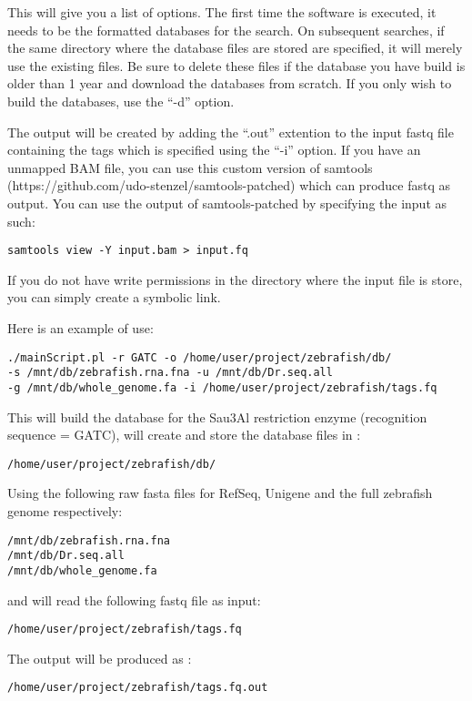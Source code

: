 \documentclass[a4paper,12pt]{article}
\begin{document}
This will give you a list of options. The first time the software is executed, it needs to be the formatted databases for the search. On subsequent searches, if the same directory where the database files are stored are specified, it will merely use the existing files. Be sure to delete these files if the database you have build is older than 1 year and download the databases from scratch. If you only wish to build the databases, use the ``-d'' option. 

The output will be created by adding the ``.out'' extention to the input fastq file containing the tags which is specified using the ``-i'' option. If you have an unmapped BAM file, you can use this custom version of samtools (https://github.com/udo-stenzel/samtools-patched) which can produce fastq as output. You can use the output of samtools-patched by specifying the input as such:
\small{
\begin{verbatim}
samtools view -Y input.bam > input.fq
\end{verbatim}
}

If you do not have write permissions in the directory where the input file is store, you can simply create a symbolic link. 

Here is an example of use:

\small{
\begin{verbatim}
./mainScript.pl -r GATC -o /home/user/project/zebrafish/db/ 
-s /mnt/db/zebrafish.rna.fna -u /mnt/db/Dr.seq.all 
-g /mnt/db/whole_genome.fa -i /home/user/project/zebrafish/tags.fq
\end{verbatim}
}

This will build the database for the Sau3Al restriction enzyme (recognition sequence = GATC), will create and store the database files in :
\begin{verbatim}
/home/user/project/zebrafish/db/ 
\end{verbatim}
Using the following raw fasta files for RefSeq, Unigene and the full zebrafish genome respectively:

\begin{verbatim}
/mnt/db/zebrafish.rna.fna
/mnt/db/Dr.seq.all 
/mnt/db/whole_genome.fa
\end{verbatim}
and will read the following fastq file as input:
\begin{verbatim}
/home/user/project/zebrafish/tags.fq
\end{verbatim}
The output will be produced as :
\begin{verbatim}
/home/user/project/zebrafish/tags.fq.out
\end{verbatim}
\end{document}
